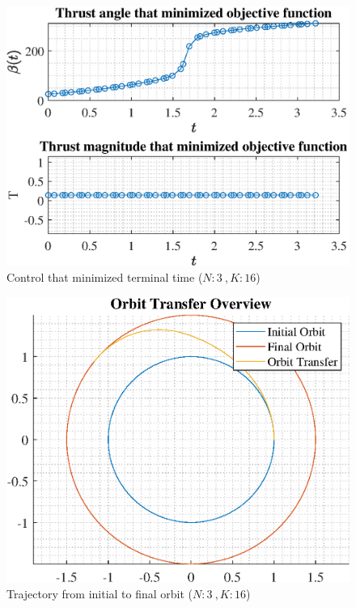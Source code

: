 \documentclass[]{article}
\begin{document}
\begin{figure}
	\centering
	\includegraphics[scale=0.75]{control_N3_K16_C2_tf.eps}
	\caption{Control that minimized terminal time (\(N:3\ , K:16\))}
	\label{fig:control_N3_K16_C2_tf}
\end{figure}
\begin{figure}
	\centering
	\includegraphics[scale=0.75]{orbit_N3_K16_C2_tf.eps}
	\caption{Trajectory from initial to final orbit (\(N:3\ , K:16\))}
	\label{fig:orbit_N3_K16_C2_tf}
\end{figure}
\end{document}
